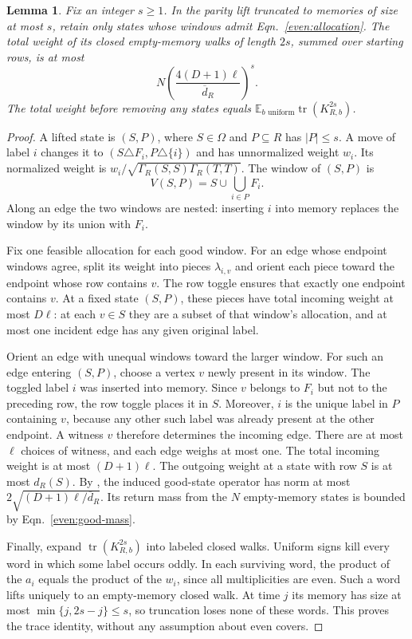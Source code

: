 \documentclass[letterpaper,11pt]{article}
\newtheorem{lemma}[theorem]{Lemma}
\theoremstyle{definition}
\newcommand{\E}{\mathbb E}
\newcommand{\abs}[1]{\left|#1\right|}
\DeclareMathOperator{\tr}{tr}
\begin{document}
\begin{lemma}\label{even:good-trace}
Fix an integer $s\geq1$. In the parity lift truncated to memories of
size at most $s$, retain only states whose windows admit
Eqn.~\eqref{even:allocation}. The total weight of its closed
empty-memory walks of length $2s$, summed over starting rows, is at most
\begin{equation}\label{even:good-mass}
 N\left(\frac{4(D+1)\ell}{\overline d_R}\right)^s.
\end{equation}
The total weight before removing any states equals
$\E_{b\text{ uniform}}\tr(K_{R,b}^{2s})$.
\end{lemma}

\begin{proof}
A lifted state is $(S,P)$, where $S\in\Omega$ and $P\subseteq R$ has
$\abs P\leq s$. A move of label $i$ changes it to
$(S\triangle F_i,P\triangle\{i\})$ and has unnormalized weight $w_i$.
Its normalized weight is $w_i/\sqrt{\Gamma_R(S,S)\Gamma_R(T,T)}$.
The window of $(S,P)$ is
\[
 V(S,P)=S\cup\bigcup_{i\in P}F_i.
\]
Along an edge the two windows are nested: inserting $i$ into memory
replaces the window by its union with $F_i$.

Fix one feasible allocation for each good window. For an edge whose
endpoint windows agree, split its weight into pieces $\lambda_{i,v}$
and orient each piece toward the endpoint whose row contains $v$.
The row toggle ensures that exactly one endpoint contains $v$.
At a fixed state $(S,P)$, these pieces have total incoming weight at most
$D\ell$: at each $v\in S$ they are a subset of that window's allocation,
and at most one incident edge has any given original label.

Orient an edge with unequal windows toward the larger window.
For such an edge entering $(S,P)$, choose a vertex $v$ newly present
in its window. The toggled label $i$ was inserted into memory.
Since $v$ belongs to $F_i$ but not to the preceding row, the row toggle
places it in $S$. Moreover, $i$ is the unique label in $P$ containing
$v$, because any other such label was already present at the other
endpoint. A witness $v$ therefore determines the incoming edge.
There are at most $\ell$ choices of witness, and each edge weighs at most
one. The total incoming weight is at most $(D+1)\ell$.
The outgoing weight at a state with row $S$ is at most $d_R(S)$.
By , the induced good-state operator has norm
at most $2\sqrt{(D+1)\ell/\overline d_R}$. Its return mass from the
$N$ empty-memory states is bounded by Eqn.~\eqref{even:good-mass}.

Finally, expand $\tr(K_{R,b}^{2s})$ into labeled closed walks.
Uniform signs kill every word in which some label occurs oddly.
In each surviving word, the product of the $a_i$ equals the product of
the $w_i$, since all multiplicities are even. Such a word lifts uniquely
to an empty-memory closed walk. At time $j$ its memory has size at most
$\min\{j,2s-j\}\leq s$, so truncation loses none of these words.
This proves the trace identity, without any assumption about even covers.
\end{proof}
\end{document}
